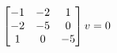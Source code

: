 \documentclass[preview]{standalone}
\begin{document}
\begin{align*}
\special{dvisvgm:raw <g id='unique000'>}\begin{bmatrix} -1 & -2 & 1 \\ -2 & -5 & 0 \\ 1 & 0 & -5 \end{bmatrix} v = 0\special{dvisvgm:raw </g>}
\end{align*}
\end{document}
